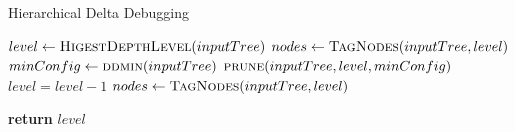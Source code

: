 \begin{algorithm}
\caption{Hierarchical Delta Debugging}
\hrulefill
\begin{algorithmic}[1]
    \State $level\gets\textsc{HigestDepthLevel}(inputTree)$
    \State $nodes\gets\textsc{TagNodes}(inputTree,level)$ 
	\State $minConfig\gets\textsc{ddmin}(inputTree)$
	\State $\textsc{prune}(inputTree,level,minConfig)$
	\State $level = level - 1$
	\State $nodes\gets\textsc{TagNodes}(inputTree,level)$ 	
	\EndWhile

    \State \textbf{return} $level$ 
\EndProcedure
\end{algorithmic}
\label{alg:hdd}
\end{algorithm}

